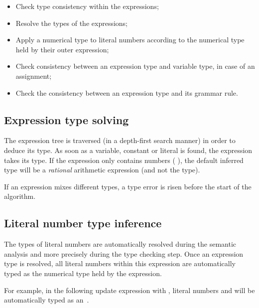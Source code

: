 \begin{itemize}
	\item Check type consistency within the expressions;
	\item Resolve the types of the expressions;
	\item Apply a numerical type to literal numbers according to the numerical type held by their outer expression;
	\item Check consistency between an expression type and variable type, in case of an assignment;
	\item Check the consistency between an expression type and its grammar rule.
\end{itemize}

\subsection{Expression type solving}

The expression tree is traversed (in a depth-first search manner) in order to deduce its type.
As soon as a variable, constant or literal is found, the expression takes its type.
If the expression only contains numbers (\eg{} ), the default inferred type will be a \emph{rational} arithmetic expression (and not the  type).

If an expression mixes different types, a type error is risen before the start of the algorithm.


\subsection{Literal number type inference}

The types of literal numbers are automatically resolved during the semantic analysis and more precisely during the type checking step.
Once an expression type is resolved, all literal numbers within this expression are automatically typed as the numerical type held by the expression.

For example, in the following update expression  with , literal numbers  and  will be automatically typed as an~.

